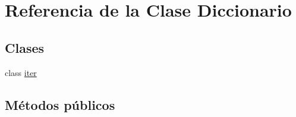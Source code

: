 \hypertarget{classDiccionario}{}\section{Referencia de la Clase Diccionario}
\label{classDiccionario}
\subsection*{Clases}
\begin{DoxyCompactItemize}
\item 
class \hyperlink{classDiccionario_1_1iter}{iter}
\end{DoxyCompactItemize}
\subsection*{Métodos públicos}
